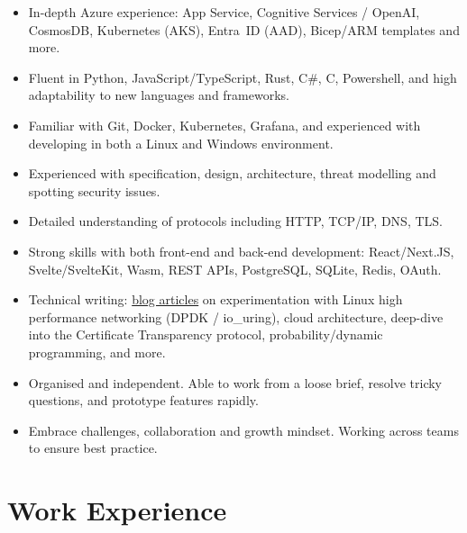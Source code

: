   \begin{itemize}
    \setlength\itemsep{0.1\parskip}
    \item In-depth Azure experience: App Service, Cognitive Services / OpenAI, CosmosDB, Kubernetes (AKS), Entra~ID (AAD), Bicep/ARM templates and more.
    \item Fluent in Python, JavaScript/TypeScript, Rust, C\#, C, Powershell, and high adaptability to new languages and frameworks.
    \item Familiar with Git, Docker, Kubernetes, Grafana, and experienced with developing in both a Linux and Windows environment.
    \item Experienced with specification, design, architecture, threat modelling and spotting security issues.
    \item Detailed understanding of protocols including HTTP, TCP/IP, DNS, TLS.
    \item Strong skills with both front-end and back-end development: React/Next.JS, Svelte/SvelteKit, Wasm, REST APIs, PostgreSQL, SQLite, Redis, OAuth.
    \item Technical writing: \href{https://blog.maowtm.org/}{\color{link}blog articles} on experimentation with Linux high performance networking (DPDK / io\_uring), cloud architecture, deep-dive into the Certificate Transparency protocol, probability/dynamic programming, and more.
    \item Organised and independent. Able to work from a loose brief, resolve tricky questions, and prototype features rapidly.
    \item Embrace challenges, collaboration and growth mindset. Working across teams to ensure best practice.
  \end{itemize}

  \section{Work Experience}

